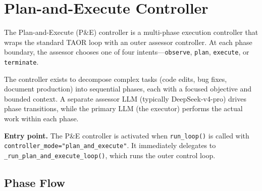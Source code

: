 \documentclass[11pt,letterpaper]{report}
\newcommand{\code}[1]{\texttt{#1}}
\begin{document}
\chapter{Plan-and-Execute Controller}
\label{ch:controller}

The Plan-and-Execute (P\&E) controller is a multi-phase execution
controller that wraps the standard TAOR loop with an outer assessor
controller. At each phase boundary, the assessor chooses one of four
intents---\code{observe}, \code{plan}, \code{execute}, or
\code{terminate}.

The controller exists to decompose complex tasks (code edits, bug fixes,
document production) into sequential phases, each with a focused
objective and bounded context. A separate assessor LLM (typically
DeepSeek-v4-pro) drives phase transitions, while the primary LLM
(the executor) performs the actual work within each phase.

\medskip\noindent\textbf{Entry point.}
The P\&E controller is activated when \code{run\_loop()} is called with
\code{controller\_mode="plan\_and\_execute"}. It immediately
delegates to \code{\_run\_plan\_and\_execute\_loop()},
which runs the outer control loop.


\section{Phase Flow}
\label{sec:phase-flow}
\end{document}
